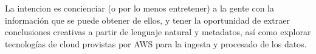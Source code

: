 La intencion es concienciar (o por lo menos entretener) a la gente con la información que se puede obtener de ellos, y tener la oportunidad de extraer conclusiones creativas a partir de lenguaje natural y metadatos, así como explorar tecnologías de cloud provistas por AWS para la ingesta y procesado de los datos.